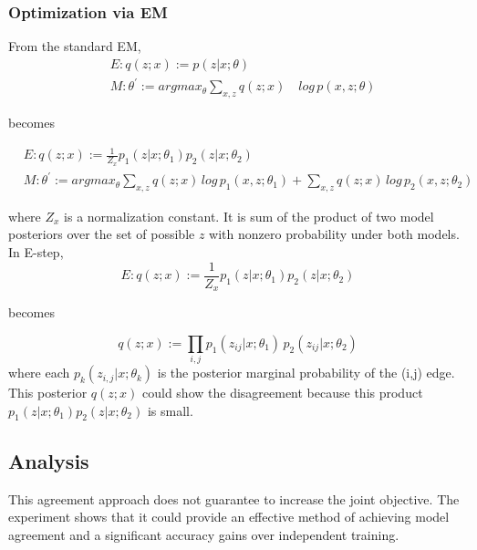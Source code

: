 \documentclass{article}
\begin{document}
\subsubsection{Optimization via EM}
From the standard EM,
\begin{equation}
\begin{split}
& E: q(z;x) := p(z|x ;\theta) \\
& M: \theta^{'} := argmax_{\theta} \sum_{x,z} q(z;x) \quad log \,  p(x,z;\theta)
\end{split}
\end{equation}

becomes

\begin{equation}
\begin{split}
& E: q(z;x) := \frac{1}{Z_x} p_1(z|x ;\theta_1) p_2(z|x ;\theta_2) \\
& M: \theta^{'} := argmax_{\theta} \sum_{x,z} q(z;x) \, log \,  p_1(x,z;\theta_1) +  \sum_{x,z} q(z;x) \, log \,  p_2(x,z;\theta_2)
\end{split}
\end{equation}

where $Z_x$ is a normalization constant. It is sum of the product of two model posteriors over the set of possible $z$ with nonzero probability under both models.\\

In E-step,
\begin{equation}
 E: q(z;x) := \frac{1}{Z_x} p_1(z|x ;\theta_1) p_2(z|x ;\theta_2)
\end{equation}

becomes

\begin{equation}
q(z;x) := \prod_{i,j} p_1(z_{ij} | x; \theta_1) \, p_2(z_{ij} | x; \theta_2)
\end{equation}
where each $p_k(z_{i,j}|x; \theta_k)$ is the posterior marginal probability of the (i,j) edge.\\

This posterior $q(z;x)$ could show the disagreement because this product $p_1(z|x ;\theta_1) p_2(z|x ;\theta_2)$ is small.

\subsection{Analysis}
This agreement approach does not guarantee to increase the joint objective. The experiment shows that it could provide an effective method of achieving model agreement and a significant accuracy gains over independent training.
\end{document}
